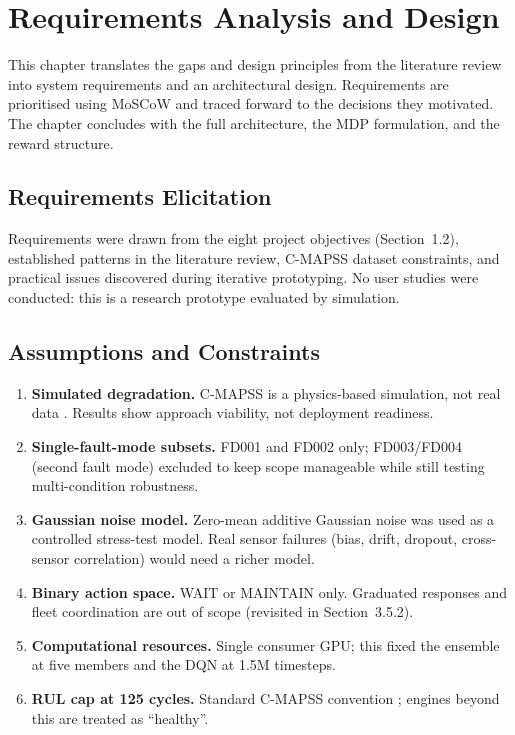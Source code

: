 \documentclass[12pt,a4paper]{report}
\begin{document}
\chapter{Requirements Analysis and Design}

This chapter translates the gaps and design principles from the literature review into system requirements and an architectural design. Requirements are prioritised using MoSCoW and traced forward to the decisions they motivated. The chapter concludes with the full architecture, the MDP formulation, and the reward structure.

\section{Requirements Elicitation}

Requirements were drawn from the eight project objectives (Section~1.2), established patterns in the literature review, C-MAPSS dataset constraints, and practical issues discovered during iterative prototyping. No user studies were conducted: this is a research prototype evaluated by simulation.

\section{Assumptions and Constraints}

\begin{enumerate}[label=\textbf{A\arabic*.}, leftmargin=2cm]
  \item \textbf{Simulated degradation.} C-MAPSS is a physics-based simulation, not real data \citep{ramasso2014review}. Results show approach viability, not deployment readiness.

  \item \textbf{Single-fault-mode subsets.} FD001 and FD002 only; FD003/FD004 (second fault mode) excluded to keep scope manageable while still testing multi-condition robustness.

  \item \textbf{Gaussian noise model.} Zero-mean additive Gaussian noise was used as a controlled stress-test model. Real sensor failures (bias, drift, dropout, cross-sensor correlation) would need a richer model.

  \item \textbf{Binary action space.} WAIT or MAINTAIN only. Graduated responses and fleet coordination are out of scope (revisited in Section~3.5.2).

  \item \textbf{Computational resources.} Single consumer GPU; this fixed the ensemble at five members and the DQN at 1.5M timesteps.

  \item \textbf{RUL cap at 125 cycles.} Standard C-MAPSS convention \citep{heimes2008recurrent}; engines beyond this are treated as ``healthy''.
\end{enumerate}
\end{document}
